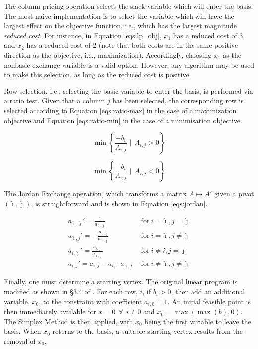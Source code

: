 The column pricing operation selects the slack variable which will enter the
basis. The most naive implementation is to select the variable which will have
the largest effect on the objective function, i.e., which has the largest
magnitude \textit{reduced cost}. For instance, in Equation \ref{eqs:lp_obj},
$x_1$ has a reduced cost of 3, and $x_2$ has a reduced cost of 2 (note that both
costs are in the same positive direction as the objective, i.e.,
maximization). Accordingly, choosing $x_1$ as the nonbasic exchange variable is
a valid option. However, any algorithm may be used to make this selection, as
long as the reduced cost is positive.

Row selection, i.e., selecting the basic variable to enter the basis, is
performed via a ratio test. Given that a column $j$ has been selected, the
corresponding row is selected according to Equation \ref{eqs:ratio-max} in the
case of a maximization objective and Equation \ref{eqs:ratio-min} in the case of
a minimization objective.

\begin{equation}\label{eqs:ratio-max}
  \min \left\{ \frac{-b_i}{A_{i,j}} \:\: | \:\: A_{i,j} > 0 \right\}
\end{equation}

\begin{equation}\label{eqs:ratio-min}
  \min \left\{ \frac{-b_i}{A_{i,j}} \:\: | \:\: A_{i,j} < 0 \right\}
\end{equation}

The Jordan Exchange operation, which transforms a matrix $A \mapsto A'$
given a pivot $(\hat{\imath}, \hat{\jmath})$, is straightforward and is shown in
Equation \ref{eqs:jordan}.

\begin{subequations}\label{eqs:jordan}
  \begin{align}
    a_{\hat{\imath},\hat{\jmath}}' = \frac{1}{a_{\hat{\imath},\hat{\jmath}}}
    &\:\: \text{for} \:
    i = \hat{\imath}, j = \hat{\jmath} \\
    a_{\hat{\imath},j}' = -\frac{a_{\hat{\imath},j}}{a_{\hat{\imath},\hat{\jmath}}}
    &\:\: \text{for} \:
    i = \hat{\imath}, j \neq \hat{\jmath} \\
    a_{i,\hat{\jmath}}' = \frac{a_{i,\hat{\jmath}}}{a_{\hat{\imath},\hat{\jmath}}}
    &\:\: \text{for} \:
    i \neq i, j = \hat{\jmath} \\
    a_{i,j}' = a_{i,j} - a_{i,\hat{\jmath}} a_{\hat{\imath},j}
    &\:\: \text{for} \:
    i \neq \hat{\imath}, j \neq \hat{\jmath}
  \end{align}
\end{subequations}

Finally, one must determine a starting vertex. The original linear program is
modified as shown in \S 3.4 of \cite{ferris_linear_2008}. For each row, $i$, if
$b_i > 0$, then add an additional variable, $x_0$, to the constraint with
coefficient $a_{i,0} = 1$. An initial feasible point is then immediately
available for $x = 0 \:\: \forall \:\: i \neq 0$ and $x_0
= \max(\max(b),0)$. The Simplex Method is then applied, with $x_0$ being the
first variable to leave the basis. When $x_0$ returns to the basis, a suitable
starting vertex results from the removal of $x_0$.

